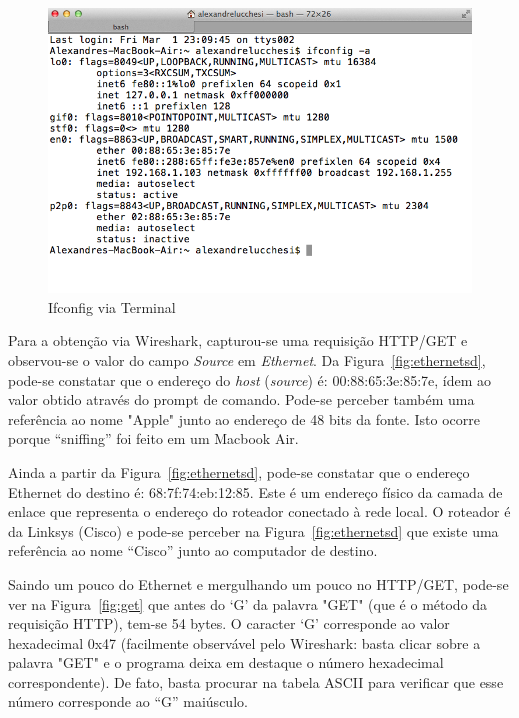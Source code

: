 \documentclass[12pt,a4paper]{report}
\begin{document}
\begin{figure}[h]
\centering
\includegraphics[width=\textwidth]{terminal-ifconfig.png}
\caption{Ifconfig via Terminal}
\label{fig:terminal}
\end{figure}

Para a obtenção via Wireshark, capturou-se uma requisição HTTP/GET e observou-se o valor do campo \textit{Source} em \textit{Ethernet}. Da Figura~\ref{fig:ethernetsd}, pode-se constatar que o endereço do \textit{host} (\textit{source}) é: 00:88:65:3e:85:7e, ídem ao valor obtido através do prompt de comando. Pode-se perceber também uma referência ao nome "Apple" junto ao endereço de 48 bits da fonte. Isto ocorre porque ``sniffing'' foi feito em um Macbook Air.

Ainda a partir da Figura~\ref{fig:ethernetsd}, pode-se constatar que o endereço Ethernet do destino é: 68:7f:74:eb:12:85. Este é um endereço físico da camada de enlace que representa o endereço do roteador conectado à rede local. O roteador é da Linksys (Cisco) e pode-se perceber na Figura~\ref{fig:ethernetsd} que existe uma referência ao nome ``Cisco'' junto ao computador de destino.

Saindo um pouco do Ethernet e mergulhando um pouco no HTTP/GET, pode-se ver na Figura~\ref{fig:get} que antes do `G' da palavra "GET" (que é o método da requisição HTTP), tem-se 54 bytes. O caracter `G' corresponde ao valor hexadecimal 0x47 (facilmente observável pelo Wireshark: basta clicar sobre a palavra "GET" e o programa deixa em destaque o número hexadecimal correspondente). De fato, basta procurar na tabela ASCII para verificar que esse número corresponde ao ``G'' maiúsculo.
\end{document}
